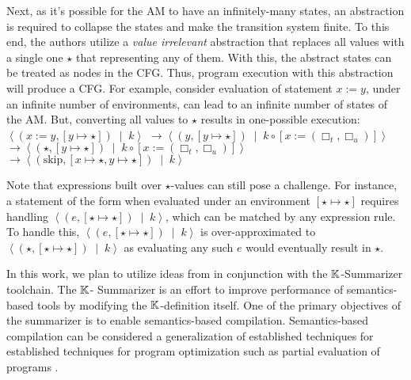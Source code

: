 Next, as it's possible for the AM to have an infinitely-many states, an
abstraction is required to collapse the states and make the transition system
finite. To this end, the authors utilize a \emph{value irrelevant} abstraction
that replaces all values with a single one $\star$ that representing any of
them. With this, the abstract states can be treated as nodes in the CFG.
Thus, program execution with this abstraction will produce a CFG.
For example, consider evaluation of statement $x := y$, under an
infinite number of environments, can lead to an infinite number of
states of the AM.
But, converting all values to $\star$ results in
one-possible execution: $\left\langle \left( x := y, \left[ y \mapsto \star
    \right] \right) \;\mid\; k \right\rangle$
$\rightarrow  \left\langle \left(y, \left[ y \mapsto \star \right] \right) \;\mid\; k \circ \left[ x := \left(\Box_t,\Box_u\right) \right] \right\rangle$
$\rightarrow  \left\langle \left(\star, \left[ y \mapsto \star \right] \right) \;\mid\; k \circ \left[ x := \left(\Box_t,\Box_u\right) \right] \right\rangle$
$\rightarrow  \left\langle \left(\text{skip}, \left[x \mapsto \star, y \mapsto \star \right] \right) \;\mid\; k \right\rangle$

Note that expressions built over $\star$-values can still pose a
challenge. For instance, a statement of the form  when
evaluated under an environment $\left[\star \mapsto \star\right]$ requires
handling $\left\langle \left(e, \left[ \star \mapsto \star \right] \right)\;\mid\; k
\right\rangle$, which can be matched by any expression rule. To handle this,
$\left\langle \left(e, \left[ \star \mapsto \star \right] \right)\;\mid\; k \right\rangle$
is over-approximated to $\left \langle \left(\star, \left[ \star \mapsto \star \right] \right)\;\mid\; k \right\rangle$
as evaluating any such $e$ would eventually result in $\star$.



In this work, we plan to utilize ideas from \cite{KoppelICFP22}
in conjunction with the $\mathbb{K}{}$-Summarizer toolchain. The $\mathbb{K}{}$-
Summarizer is an effort to improve performance of semantics-based tools
by modifying the $\mathbb{K}$-definition itself. One of the primary objectives
of the summarizer is to enable semantics-based compilation.
Semantics-based compilation can be considered a generalization of
established techniques for established techniques for program optimization
such as partial evaluation of programs \cite{Jones93Book}.

